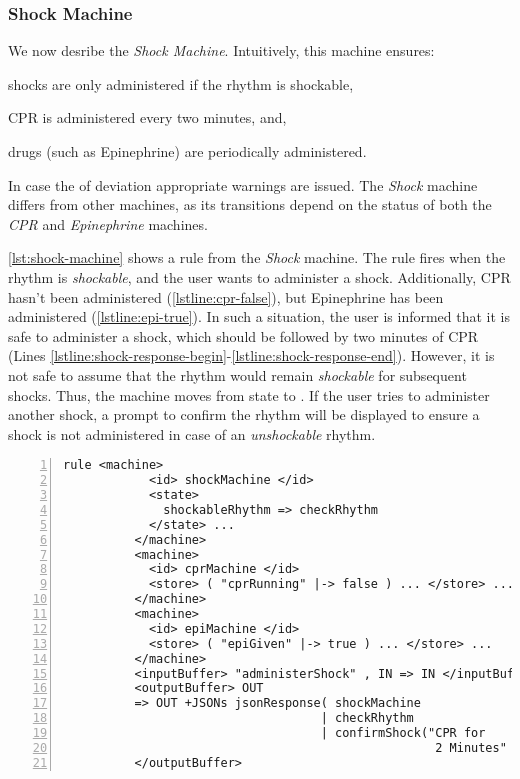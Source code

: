 \subsubsection{Shock Machine}

We now desribe the \textit{Shock Machine}. Intuitively, this
machine ensures:
\begin{enumerate*}[label=(\alph*)]
  \item shocks are only administered if the rhythm is shockable,
  \item CPR is administered every two minutes, and,
  \item drugs (such as Epinephrine) are periodically administered.
\end{enumerate*}
In case the of deviation appropriate warnings are issued. The \textit{Shock}
machine differs from other machines, as its transitions depend
on the status of both the \textit{CPR} and \textit{Epinephrine} machines.

\autoref{lst:shock-machine} shows a rule from the \textit{Shock} machine.
The rule fires when the rhythm is \textit{shockable}, and the user
wants to administer a shock. Additionally, CPR hasn't been administered
(\autoref{lstline:cpr-false}), but
Epinephrine has been administered (\autoref{lstline:epi-true}).
In such a situation, the user is informed that it is safe to
administer a shock, which should be followed by
two minutes of CPR (Lines
\ref{lstline:shock-response-begin}-\ref{lstline:shock-response-end}).
However, it is not safe to assume that the rhythm would remain
\textit{shockable} for subsequent shocks. Thus, the machine moves from
state  to . If the
user tries to administer another shock, a prompt to confirm the rhythm will be
displayed to ensure a shock is not administered in case of an \emph{unshockable}
rhythm.

\begin{lstlisting}[float=ht,
  frame=single,
  style=ksty,
  language=k,
  numbers=left,
  numbersep=5pt,
  caption={Shock Machine in $\K$},
  label={lst:shock-machine},
  xleftmargin=3ex
]
    rule <machine>
            <id> shockMachine </id>
            <state>
              shockableRhythm => checkRhythm                         @\label{lstline:shock-state}@
            </state> ...
          </machine>
          <machine>
            <id> cprMachine </id>
            <store> ( "cprRunning" |-> false ) ... </store> ...      @\label{lstline:cpr-false}@
          </machine>
          <machine>
            <id> epiMachine </id>
            <store> ( "epiGiven" |-> true ) ... </store> ...        @\label{lstline:epi-true}@
          </machine>
          <inputBuffer> "administerShock" , IN => IN </inputBuffer>
          <outputBuffer> OUT                                        @\label{lstline:shock-response-begin}@
          => OUT +JSONs jsonResponse( shockMachine
                                    | checkRhythm
                                    | confirmShock("CPR for
                                                    2 Minutes" ) )  @\label{lstline:shock-response-end}@
          </outputBuffer>
\end{lstlisting}

